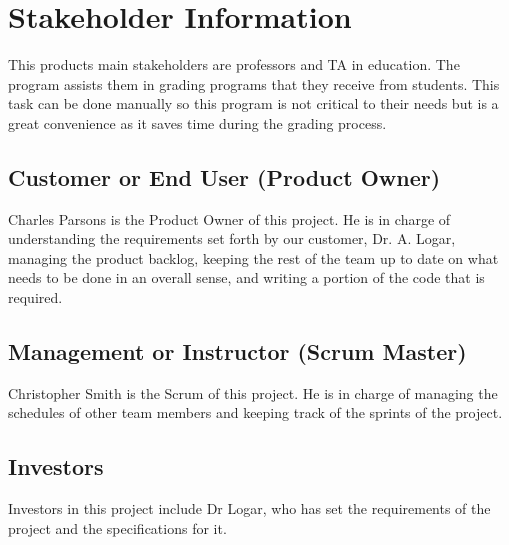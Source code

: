 

\section{ Stakeholder Information}
This products main stakeholders are professors and TA in education.
The program assists them in grading programs that they receive from students. 
This task can be done manually so this program is not critical to their needs but is a 
great convenience as it saves time during the grading process.



\subsection{Customer or End User (Product Owner)}
Charles Parsons is the Product Owner of this project. He is in charge of understanding the requirements set forth by our
customer, Dr. A. Logar, managing the product backlog, keeping the rest of the team up to date on what
needs to be done in an overall sense, and writing a portion of the code that is required.


\subsection{Management or Instructor (Scrum Master)}
Christopher Smith is the Scrum of this project. He is in charge of managing the schedules of other team members
and keeping track of the sprints of the project.



\subsection{Investors}
Investors in this project include Dr Logar, who has set the requirements of the project and the specifications for it.



